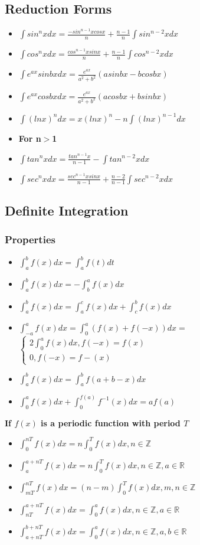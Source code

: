 \documentclass[twocolumn, 10pt]{article}
\begin{document}
\subsection{Reduction Forms}
\begin{itemize}
\item $\int sin^{n}xdx= \frac{-sin^{n-1}xcosx}{n}+ \frac{n-1}{n} \int sin^{n-2}xdx$ 
\item $\int cos^{n}xdx= \frac{cos^{n-1}xsinx}{n}+ \frac{n-1}{n} \int cos^{n-2}xdx$
\item $\int e^{ax}sinbxdx = \frac{e^{ax}}{a^2+b^2}(asinbx-bcosbx)$
\item $\int e^{ax}cosbxdx = \frac{e^{ax}}{a^2+b^2}(acosbx+bsinbx)$
\item $\int (lnx)^{n}dx = x(lnx)^{n} -n \int (lnx)^{n-1}dx$
\item \textbf{For n$>$1} 
\item $\int tan^{n}xdx= \frac{tan^{n-1}x}{n-1}- \int tan^{n-2}xdx$ 
\item $\int sec^{n}xdx= \frac{sec^{n-1}xsinx}{n-1}+ \frac{n-2}{n-1} \int sec^{n-2}xdx$ 
\end{itemize}
\subsection{Definite Integration}
\subsubsection{Properties}
\begin{itemize}
\item $\int_{a}^{b}f(x)dx=\int_{a}^{b}f(t)dt$
\item $\int_{a}^{b}f(x)dx=-\int_{b}^{a}f(x)dx$
\item $\int_{a}^{b}f(x)dx=\int_{a}^{c}f(x)dx+\int_{c}^{b}f(x)dx$
\item $\int_{-a}^{a}f(x)dx=\int_{0}^{a}(f(x)+f(-x))dx=$ $\begin{cases}
  2\int_{0}^{a}f(x)dx,f(-x)=f(x)\\
  0,f(-x)=f-(x)
\end{cases}$
\item $\int_{a}^{b}f(x)dx=\int_{a}^{b}f(a+b-x)dx$
\item $\int_{0}^{a}f(x)dx + \int_{0}^{f(a)}f^{-1}(x)dx = af(a)$
\end{itemize}

\textbf{If $f(x)$ is a periodic function with period $T$}
\begin{itemize}
\item $\int_{0}^{nT}f(x)dx=n\int_{0}^{T}f(x)dx,n \in \mathbb{Z}$
\item $\int_{a}^{a+nT}f(x)dx=n\int_{0}^{T}f(x)dx, n \in \mathbb{Z},a \in \mathbb{R}$
\item $\int_{mT}^{nT}f(x)dx=(n-m)\int_{0}^{T}f(x)dx, m,n \in \mathbb{Z}$
\item $\int_{nT}^{a+nT}f(x)dx=\int_{0}^{a}f(x)dx, n \in \mathbb{Z}, a \in \mathbb{R}$
\item $\int_{a+nT}^{b+nT}f(x)dx=\int_{0}^{a}f(x)dx,n \in \mathbb{Z}, a,b \in \mathbb{R}$
\end{itemize}
\end{document}
